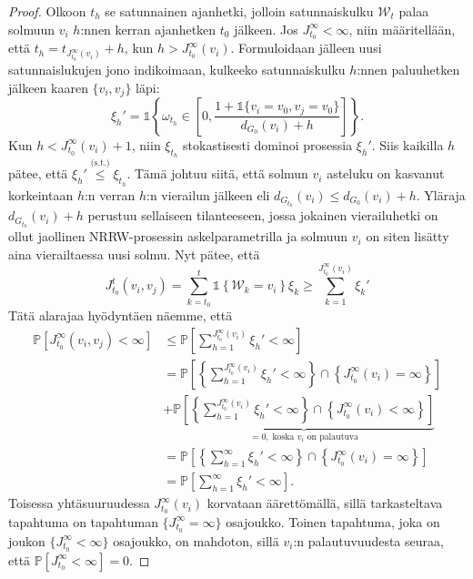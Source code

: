 \documentclass[finnish, 12pt, a4paper, sci, utf8, pdfa]{aaltothesis}
\newcommand{\Wrandom}{\mathcal{W}}
\newcommand{\indicator}{\mathopen{\mathds{1}}}
\newcommand*{\prob}{\mathbb{P}}
\begin{document}
\begin{proof}
   Olkoon $ t_{h} $ se satunnainen ajanhetki, jolloin satunnaiskulku $ \Wrandom_{t} $ palaa solmuun $ v_{i} $ $ h $:nnen kerran ajanhetken $ t_{0} $ jälkeen. Jos $ J_{t_{0}}^{\infty} < \infty $,
   niin määritellään, että $ t_{h} = t_{J_{t_{0}}^{\infty}(v_{i})} + h $, kun $ h > J_{t_{0}}^{\infty}(v_{i}) $. Formuloidaan jälleen uusi satunnaislukujen jono indikoimaan, kulkeeko 
   satunnaiskulku $ h $:nnen paluuhetken jälkeen kaaren $ \{ v_{i}, v_{j} \} $ läpi:
   \[
      \xi_{h}' = \indicator \left\{ \omega_{t_{h}} \in \left[ 0, \frac{1 + \indicator \{ v_{i} = v_{0}, v_{j} = v_{0} \}}{d_{G_{0}}(v_{i}) + h} \right] \right\}.
   \]
   Kun $ h < J_{t_{0}}^{\infty}(v_{i}) + 1 $, niin $ \xi_{t_{h}} $ stokastisesti dominoi prosessia $ \xi_{h}' $. Siis kaikilla $ h $ pätee, että $ \xi_{h}' \overset{\text{(s.t.)}}{\leq} \xi_{t_{h}} $.
   Tämä johtuu siitä, että solmun $ v_{i} $ asteluku on kasvanut korkeintaan $ h $:n verran $ h $:n vierailun jälkeen eli $ d_{G_{t_{h}}}(v_{i}) \leq d_{G_{0}}(v_{i}) + h $. Yläraja
   $ d_{G_{t_{h}}}(v_{i}) + h $ perustuu sellaiseen tilanteeseen, jossa jokainen vierailuhetki on ollut jaollinen NRRW-prosessin askelparametrilla ja solmuun $ v_{i} $ on siten lisätty
   aina vierailtaessa uusi solmu. Nyt pätee, että
   \[
      J_{t_{0}}^{t}(v_{i}, v_{j}) = \sum_{k = t_{0}}^{t} \indicator \left\{ \Wrandom_{k} = v_{i} \right\} \xi_{k} \geq \sum_{k = 1}^{J_{t_{0}}^{\infty}(v_{i})} \xi_{k}'
   \]
   Tätä alarajaa hyödyntäen näemme, että
   \begin{align*}
      \prob \left[ J_{t_{0}}^{\infty}(v_{i}, v_{j}) < \infty \right] &\leq \prob \left[ \sum_{h = 1}^{J_{t_{0}}^{\infty}(v_{i})} \xi_{h}' < \infty \right] \\
         &= \prob \left[ \left\{ \sum_{h = 1}^{J_{t_{0}}^{\infty}(v_{i})} \xi_{h}' < \infty \right\} \cap \left\{ J_{t_{0}}^{\infty}(v_{i}) = \infty \right\} \right] \\
         &+ \underbrace{\prob \left[ \left\{ \sum_{h = 1}^{J_{t_{0}}^{\infty}(v_{i})} \xi_{h}' < \infty \right\} \cap \left\{ J_{t_{0}}^{\infty}(v_{i}) < \infty \right\} \right]}_{= 0, \; \text{koska } v_{i} \text{ on palautuva}} \\
         &= \prob \left[ \left\{ \sum_{h = 1}^{\infty} \xi_{h}' < \infty \right\} \cap \left\{ J_{t_{0}}^{\infty}(v_{i}) = \infty \right\} \right] \\
         &= \prob \left[ \sum_{h = 1}^{\infty} \xi_{h}' < \infty \right].
   \end{align*}
   Toisessa yhtäsuuruudessa $ J_{t_{0}}^{\infty}(v_{i}) $ korvataan äärettömällä, sillä tarkasteltava tapahtuma on tapahtuman $ \{ J_{t_{0}}^{\infty} = \infty \} $ osajoukko. 
   Toinen tapahtuma, joka on joukon $ \{ J_{t_{0}}^{\infty} < \infty \} $ osajoukko, on mahdoton, sillä $ v_{i} $:n palautuvuudesta seuraa, että $ \prob \left[ J_{t_{0}}^{\infty} < \infty \right] = 0 $.


\end{proof}
\end{document}

